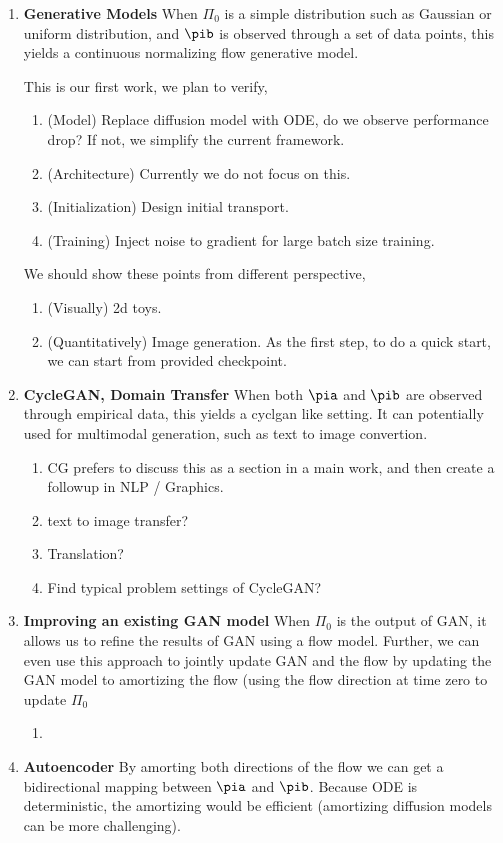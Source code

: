 \begin{enumerate}
    \item \textbf{Generative Models} When $\Pi_0$ is a simple distribution such as Gaussian or uniform distribution, and $\pib$ is observed through a set of data points, this yields a continuous normalizing flow generative model. 
    
    This is our first work, 
    we plan to verify,
    \begin{enumerate}
        \item (Model) Replace diffusion model with ODE, do we observe performance drop? If not, we simplify the current framework.
        \item (Architecture) Currently we do not focus on this.
        \item (Initialization) Design initial transport.
        \item (Training) Inject noise to gradient for large batch size training. %
    \end{enumerate}
    We should show these points from different perspective,
    \begin{enumerate}
        \item (Visually) 2d toys.
        \item (Quantitatively) Image generation. As the first step, to do a quick start, we can start from provided checkpoint. 
    \end{enumerate}
    \item \textbf{CycleGAN, Domain Transfer} When both $\pia$ and $\pib$ are observed through empirical data, this yields a cyclgan like setting. It can potentially used for multimodal generation, such as text to image convertion. 
    \begin{enumerate}
        \item {} CG prefers to discuss this as a section in a main work, and then create a followup in NLP / Graphics.
        \item text to image transfer?
        \item Translation?
        \item Find typical problem settings of CycleGAN?
    \end{enumerate}    
    \item \textbf{Improving an existing GAN model} 
When $\Pi_0$ is the output of GAN, it allows us to refine the results of GAN using a flow model. 
Further, we can even use this approach to jointly update GAN and the flow by updating the GAN model to amortizing the flow (using the flow direction at time zero to update $\Pi_0$
    \begin{enumerate}
        \item {} 
    \end{enumerate}
\item \textbf{Autoencoder} 
By amorting both directions of the flow we can get a bidirectional mapping between $\pia$ and $\pib$. 
Because ODE is deterministic, the amortizing would be efficient (amortizing diffusion models can be more challenging). 


\end{enumerate}

